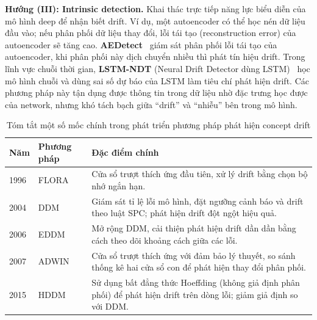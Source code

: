 \textbf{Hướng (III): Intrinsic detection.} Khai thác trực tiếp năng lực biểu diễn của mô hình deep để nhận biết drift. Ví dụ, một autoencoder có thể học nén dữ liệu đầu vào; nếu phân phối dữ liệu thay đổi, lỗi tái tạo (reconstruction error) của autoencoder sẽ tăng cao. \textbf{AEDetect}~\cite{jaworski2020aedetect} giám sát phân phối lỗi tái tạo của autoencoder, khi phân phối này dịch chuyển nhiều thì phát tín hiệu drift. Trong lĩnh vực chuỗi thời gian, \textbf{LSTM-NDT} (Neural Drift Detector dùng LSTM)~\cite{yuan2022advances} học mô hình chuỗi và dùng sai số dự báo của LSTM làm tiêu chí phát hiện drift. Các phương pháp này tận dụng được thông tin trong dữ liệu nhờ đặc trưng học được của network, nhưng khó tách bạch giữa ``drift'' và ``nhiễu'' bên trong mô hình.


\begin{table}[H]
	\centering
	\caption{Tóm tắt một số mốc chính trong phát triển phương pháp phát hiện concept drift}\label{tab:drift-history}
	\begin{tabular}{@{}p{1.2cm}p{2.8cm}p{9cm}@{}}
		\toprule
		\textbf{Năm} & \textbf{Phương pháp}                & \textbf{Đặc điểm chính}                                                                                                                                                                 \\
		\midrule
		1996         & FLORA~\cite{widmer1996learning}     & Cửa sổ trượt thích ứng đầu tiên, xử lý drift bằng chọn bộ nhớ ngắn hạn.                                                                                                                 \\
		2004         & DDM~\cite{gama2004learning}         & Giám sát tỉ lệ lỗi mô hình, đặt ngưỡng cảnh báo và drift theo luật SPC; phát hiện drift đột ngột hiệu quả.                                                                              \\
		2006         & EDDM~\cite{baena2006early}          & Mở rộng DDM, cải thiện phát hiện drift dần dần bằng cách theo dõi khoảng cách giữa các lỗi.                                                                                             \\
		2007         & ADWIN~\cite{bifet2007learning}      & Cửa sổ trượt thích ứng với đảm bảo lý thuyết, so sánh thống kê hai cửa sổ con để phát hiện thay đổi phân phối.                                                                          \\
		2015         & HDDM~\cite{friasblanco2015hddm}     & Sử dụng bất đẳng thức Hoeffding (không giả định phân phối) để phát hiện drift trên dòng lỗi; giảm giả định so với DDM.                                                                     \\

\end{tabular}
\end{table}
